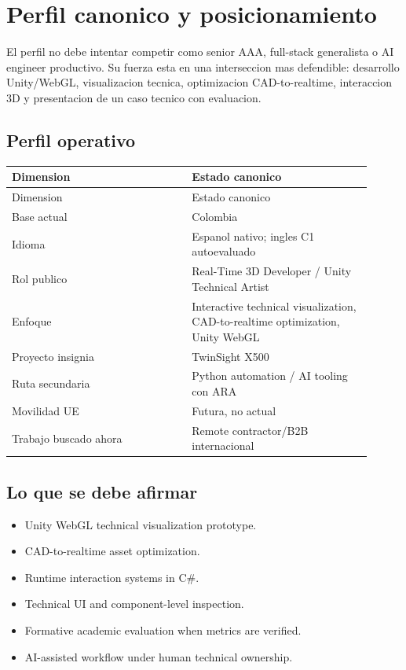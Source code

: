 \chapter{Perfil canonico y posicionamiento}


El perfil no debe intentar competir como senior AAA, full-stack generalista o AI engineer productivo. Su fuerza esta en una interseccion mas defendible: desarrollo Unity/WebGL, visualizacion tecnica, optimizacion CAD-to-realtime, interaccion 3D y presentacion de un caso tecnico con evaluacion.


\section{Perfil operativo}


\begin{center}
\scriptsize
\begin{longtable}{>{\raggedright\arraybackslash}p{0.455\linewidth} >{\raggedright\arraybackslash}p{0.455\linewidth}}
\toprule
Dimension & Estado canonico \\
\midrule
\endfirsthead
\toprule
Dimension & Estado canonico \\
\midrule
\endhead
Base actual & Colombia \\
Idioma & Espanol nativo; ingles C1 autoevaluado \\
Rol publico & Real-Time 3D Developer / Unity Technical Artist \\
Enfoque & Interactive technical visualization, CAD-to-realtime optimization, Unity WebGL \\
Proyecto insignia & TwinSight X500 \\
Ruta secundaria & Python automation / AI tooling con ARA \\
Movilidad UE & Futura, no actual \\
Trabajo buscado ahora & Remote contractor/B2B internacional \\
\bottomrule
\end{longtable}
\end{center}


\section{Lo que se debe afirmar}


\begin{itemize}
\item Unity WebGL technical visualization prototype.
\item CAD-to-realtime asset optimization.
\item Runtime interaction systems in C\#.
\item Technical UI and component-level inspection.
\item Formative academic evaluation when metrics are verified.
\item AI-assisted workflow under human technical ownership.
\end{itemize}


